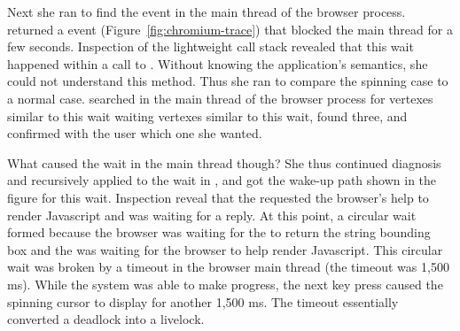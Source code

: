 
Next she ran \xxx to find the event in the main thread of the browser process.
\xxx returned a  event (Figure~\ref{fig:chromium-trace})
that blocked the main thread for a few seconds. Inspection of the
lightweight call stack revealed that this wait happened within a call to
. Without knowing the application's
semantics, she could not understand this method. Thus she ran \xxx to compare
the spinning case to a normal case. \xxx searched in the main thread of the
browser process for vertexes similar to this wait waiting vertexes similar to
this wait, found three, and confirmed with the user which one she wanted.


What caused the wait in the  main thread though?  She thus
continued diagnosis and recursively applied \xxx to the wait in ,
and got the wake-up path shown in the figure for this wait.  Inspection reveal
that the  requested the browser's help to render Javascript and was
waiting for a reply.  At this point, a circular wait formed because the browser
was waiting for the  to return the string bounding box and the
 was waiting for the browser to help render Javascript.  This
circular wait was broken by a timeout in the browser main thread (the
 timeout was 1,500 ms).  While the system was able to make
progress, the next key press caused the spinning cursor to display for another
1,500 ms.  The timeout essentially converted a deadlock into a livelock.
